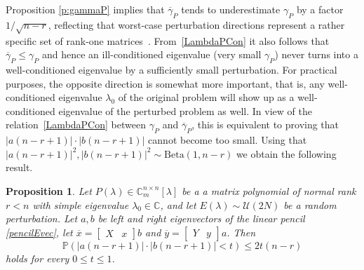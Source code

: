 \documentclass[12pt]{article}
\newcommand{\Bdist}{\mathrm{Beta}}
\newtheorem{proposition}[theorem]{Proposition}
\begin{document}
Proposition \ref{p:gammaP} implies that $\overline{\gamma}_P$ tends to underestimate $\gamma_P$ by a factor $1/\sqrt{n-r}$, reflecting that worst-case perturbation directions represent a rather specific set of rank-one matrices~\cite[Theorem 5]{tisseur2000backward}. From~\eqref{LambdaPCon} it also follows that $\overline{\gamma}_P \le \gamma_P$ and hence an ill-conditioned eigenvalue (very small $\gamma_P$) never turns into a well-conditioned eigenvalue by a sufficiently small perturbation. For practical purposes, the opposite direction is somewhat more important, that is, any well-conditioned eigenvalue $\lambda_0$ of the original problem will show up as a well-conditioned eigenvalue of the perturbed problem as well. 
In view of the relation~\eqref{LambdaPCon} between $\gamma_P$ and $\overline{\gamma}_P$, this is equivalent to proving that $|a(n-r+1)|\cdot |b(n-r+1)|$ cannot become too small.  %
Using that $|a(n-r+1)|^2,|b(n-r+1)|^2\sim \Bdist(1,n-r)$ we obtain the following result.
\begin{proposition}\label{p:gammaPopposite}
    Let $P(\lambda)\in\mathbb{C}^{n\times n}_m[\lambda]$ be a a matrix polynomial of normal rank $r<n$ with simple eigenvalue $\lambda_0\in\mathbb{C}$, and let $E(\lambda)\sim \mathcal{U}(2N)$ be a random perturbation. Let $a,b$ be left and right eigenvectors of the linear pencil \eqref{pencilEvec}, let $\overline{x} = \begin{bmatrix}
    X & x
    \end{bmatrix}b$ and $\overline{y} = \begin{bmatrix}
    Y & y
    \end{bmatrix}a$. Then
\[
        \mathbb{P}(|a(n-r+1)| \cdot |b(n-r+1)| <t)\leq2 t (n-r)
\]
    holds for every $0 \le t \le 1$.
\end{proposition}
\end{document}
